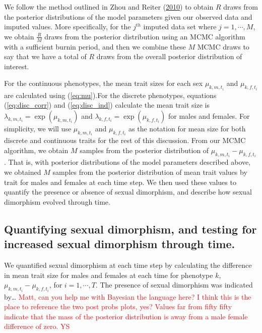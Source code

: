 \documentclass[
  12pt,
]{article}
\begin{document}
We follow the method outlined in Zhou and Reiter
(\protect\hyperlink{ref-ZhouReiter2010}{2010}) to obtain \(R\) draws
from the posterior distributions of the model parameters given our
observed data and imputed values. More specifically, for the \(j^{th}\)
imputed data set where \(j = 1,\cdots,M\), we obtain \(\frac{R}{M}\)
draws from the posterior distribution using an MCMC algorithm with a
sufficient burnin period, and then we combine these \(M\) MCMC draws to
say that we have a total of \(R\) draws from the overall posterior
distribution of interest.

For the continuous phenotypes, the mean trait sizes for each sex
\(\mu_{k,m,t_i}\) and \(\mu_{k,f,t_i}\) are calculated using
(\ref{eq:mu}).For the discrete phenotypes, equations
(\ref{eq:disc_corr}) and (\ref{eq:disc_ind}) calculate the mean trait
size is \(\lambda_{k,m,t_i} = \exp(\mu_{k,m,t_i})\) and
\(\lambda_{k,f,t_i} = \exp(\mu_{k,f,t_i})\) for males and females. For
simplicity, we will use \(\mu_{k,m,t_i}\) and \(\mu_{k,f,t_i}\) as the
notation for mean size for both discrete and continuous traits for the
rest of this discussion. From our MCMC algorithm, we obtain \(M\)
samples from the posterior distribution of
\(\mu_{k,m,t_i} - \mu_{k,f,t_i}\). That is, with posterior distributions
of the model parameters described above, we obtained \(M\) samples from
the posterior distribution of mean trait values by trait for males and
females at each time step. We then used these values to quantify the
presence or absence of sexual dimorphism, and describe how sexual
dimorphism evolved through time.

\hypertarget{quantifying-sexual-dimorphism-and-testing-for-increased-sexual-dimorphism-through-time.}{%
\subsection{Quantifying sexual dimorphism, and testing for increased
sexual dimorphism through
time.}\label{quantifying-sexual-dimorphism-and-testing-for-increased-sexual-dimorphism-through-time.}}

We quantified sexual dimorphism at each time step by calculating the
difference in mean trait size for males and females at each time for
phenotype \(k\), \(\mu_{k,m,t_i} - \mu_{k,f,t_i}\), for
\(i = 1,\cdots,T\). The presence of sexual dimorphism was indicated
by\ldots{}
\textcolor{red}{Matt, can you help me with Bayesian the language here? I think this is the place to reference the two post probs plots, yes? Values far from fifty fifty indicate that the mass of the posterior distribution is away from a male female difference of zero. YS}
\end{document}
